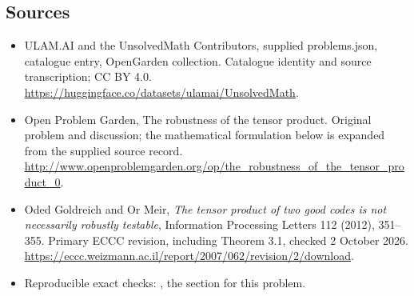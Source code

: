 \documentclass[11pt,a4paper]{article}
\begin{document}
\subsection{Sources}
\begin{itemize}
\item[S1] ULAM.AI and the UnsolvedMath Contributors, supplied problems.json, catalogue entry, OpenGarden collection. Catalogue identity and source transcription; CC BY 4.0.
\url{https://huggingface.co/datasets/ulamai/UnsolvedMath}.
\item[S2] Open Problem Garden, The robustness of the tensor product. Original problem and discussion; the mathematical formulation below is expanded from the supplied source record.
\url{http://www.openproblemgarden.org/op/the_robustness_of_the_tensor_product_0}.

\item[R1] Oded Goldreich and Or Meir, \emph{The tensor product of two
good codes is not necessarily robustly testable}, Information Processing
Letters 112 (2012), 351--355. Primary ECCC revision, including Theorem 3.1, checked
2 October 2026.
\url{https://eccc.weizmann.ac.il/report/2007/062/revision/2/download}.
\item[R2] Reproducible exact checks:
, the section for this problem.

\end{itemize}
\end{document}
